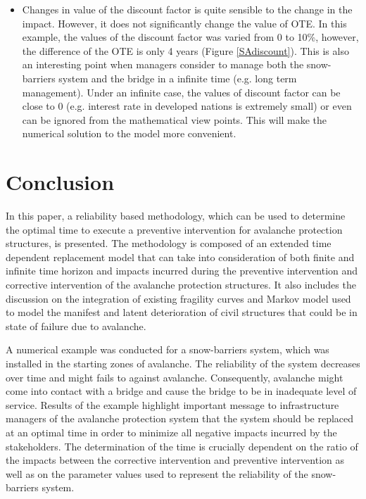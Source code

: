 \documentclass[fleqn]{article}
\begin{document}
\begin{itemize}
 \item Changes in value of the discount factor is quite sensible to the change in the impact. However, it does not significantly change the value of OTE. In this example, the values of the discount factor was varied from 0 to 10\%, however, the difference of the OTE is only 4 years (Figure \ref{SAdiscount}). This is also an interesting point when managers consider to manage both the snow-barriers system and the bridge in a infinite time (e.g. long term management). Under an infinite case, the values of discount factor can be close to 0 (e.g. interest rate in developed nations is extremely small) or even can be ignored from the mathematical view points. This will make the numerical solution to the model more convenient.
\end{itemize}
\section{Conclusion} 
\label{conclusion}
In this paper, a reliability based methodology, which can be used to determine the optimal time to execute a preventive intervention for avalanche protection structures, is presented. The methodology is composed of an extended time dependent replacement model that can take into consideration of both finite and infinite time horizon and impacts incurred during the preventive intervention and corrective intervention of the avalanche protection structures. It also includes the discussion on the integration of existing fragility curves and Markov model used to model the manifest and latent deterioration of civil structures that could be in state of failure due to avalanche.

A numerical example was conducted for a snow-barriers system, which was installed in the starting zones of avalanche. The reliability of the system decreases over time and might fails to against avalanche. Consequently, avalanche might come into contact with a bridge and cause the bridge to be in inadequate level of service. Results of the example highlight important message to infrastructure managers of the avalanche protection system that the system should be replaced at an optimal time in order to minimize all negative impacts incurred by the stakeholders. The determination of the time is crucially dependent on the ratio of the impacts between the corrective intervention and preventive intervention as well as on the parameter values used to represent the reliability of the snow-barriers system. 

 
% 



\end{document}
